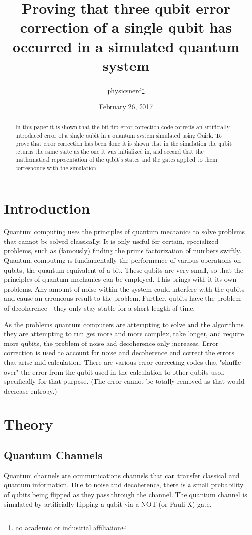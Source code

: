 \documentclass{article}
\title{Proving that three qubit error correction of a single qubit has occurred in a simulated quantum system}
\author{physicsnerd\footnote{no academic or industrial affiliation}}
\date{February 26, 2017}
\begin{document}
\maketitle

\begin{abstract}
    In this paper it is shown that the bit-flip error correction code corrects an artificially introduced error of a single qubit in a quantum system simulated using Quirk. To prove that error correction has been done it is shown that in the simulation the qubit returns the same state as the one it was initialized in, and second that the mathematical representation of the qubit's states and the gates applied to them corresponds with the simulation.
\end{abstract}

\section{Introduction}
Quantum computing uses the principles of quantum mechanics to solve problems that cannot be solved classically.\cite{chuang}
It is only useful for certain, specialized problems, such as (famously) finding the prime factorization of numbers swiftly.\cite{shor} 
Quantum computing is fundamentally the performance of various operations on qubits, the quantum equivalent of a bit. 
These qubits are very small, so that the principles of quantum mechanics can be employed. 
This brings with it its own problems. Any amount of noise within the system could interfere with the qubits and cause an erroneous result to the problem.
Further, qubits have the problem of decoherence - they only stay stable for a short length of time.\cite{decoherence}

As the problems quantum computers are attempting to solve and the algorithms they are attempting to run get more and more complex, take longer, and require more qubits, the problem of noise and decoherence only increases.
Error correction is used to account for noise and decoherence and correct the errors that arise mid-calculation.\cite{decoherence}
There are various error correcting codes that "shuffle over" the error from the qubit used in the calculation to other qubits used specifically for that purpose. 
(The error cannot be totally removed as that would decrease entropy.)

\section{Theory}
\subsection{Quantum Channels}
Quantum channels are communications channels that can transfer classical and quantum information.\cite{channel} Due to noise and decoherence, there is a small probability of qubits being flipped as they pass through the channel. The quantum channel is simulated by artificially flipping a qubit via a NOT (or Pauli-X) gate. 
\end{document}
